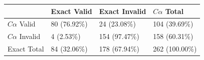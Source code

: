 \begin{tabular}{llll}
\toprule
 & Exact Valid & Exact Invalid & $C\alpha$ Total \\
\midrule
$C\alpha$ Valid & 80 (76.92\%) & 24 (23.08\%) & 104 (39.69\%) \\
$C\alpha$ Invalid & 4 (2.53\%) & 154 (97.47\%) & 158 (60.31\%) \\
Exact Total & 84 (32.06\%) & 178 (67.94\%) & 262 (100.00\%) \\
\bottomrule
\end{tabular}
